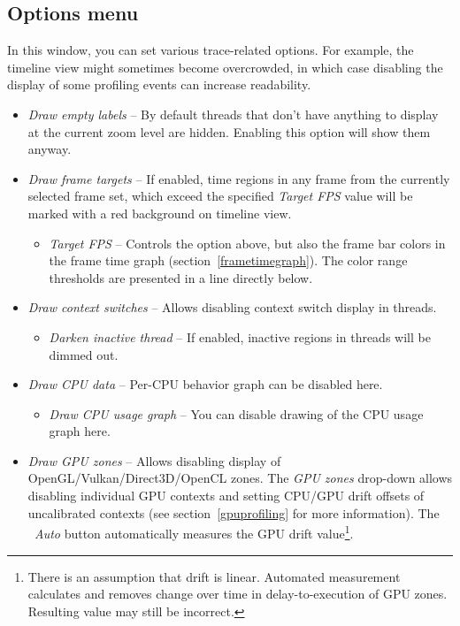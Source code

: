 \documentclass[hidelinks,titlepage,a4paper]{article}
\begin{document}
\subsection{Options menu}
\label{options}

In this window, you can set various trace-related options. For example, the timeline view might sometimes become overcrowded, in which case disabling the display of some profiling events can increase readability.

\begin{itemize}
\item \emph{\faExpand{} Draw empty labels} -- By default threads that don't have anything to display at the current zoom level are hidden. Enabling this option will show them anyway.
\item \emph{\faFlagCheckered{} Draw frame targets} -- If enabled, time regions in any frame from the currently selected frame set, which exceed the specified \emph{Target FPS} value will be marked with a red background on timeline view.
\begin{itemize}
\item \emph{Target FPS} -- Controls the option above, but also the frame bar colors in the frame time graph (section~\ref{frametimegraph}). The color range thresholds are presented in a line directly below.
\end{itemize}
\item \emph{\faHiking{} Draw context switches} -- Allows disabling context switch display in threads.
\begin{itemize}
\item \emph{\faMoon{} Darken inactive thread} -- If enabled, inactive regions in threads will be dimmed out.
\end{itemize}
\item \emph{\faSlidersH{} Draw CPU data} -- Per-CPU behavior graph can be disabled here.
\begin{itemize}
\item \emph{\faSignature{} Draw CPU usage graph} -- You can disable drawing of the CPU usage graph here.
\end{itemize}
\item \emph{\faEye{} Draw GPU zones} -- Allows disabling display of OpenGL/Vulkan/Direct3D/OpenCL zones. The \emph{GPU zones} drop-down allows disabling individual GPU contexts and setting CPU/GPU drift offsets of uncalibrated contexts (see section~\ref{gpuprofiling} for more information). The \emph{\faRobot~Auto} button automatically measures the GPU drift value\footnote{There is an assumption that drift is linear. Automated measurement calculates and removes change over time in delay-to-execution of GPU zones. Resulting value may still be incorrect.}.

\end{itemize}
\end{document}
